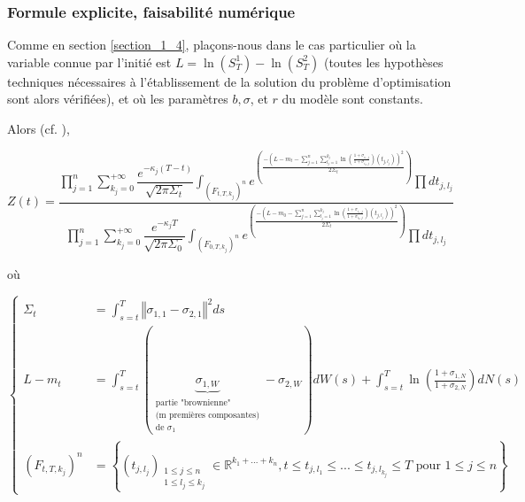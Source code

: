 \documentclass[../finalreport.tex]{subfiles}
\begin{document}
\subsubsection{Formule explicite, faisabilité numérique}

\par Comme en section \ref{section_1_4}, plaçons-nous dans le cas particulier où la variable connue par l'initié est $L = \ln \left( S_T^{1} \right) - \ln \left( S_T^{2} \right)$ (toutes les hypothèses techniques nécessaires à l'établissement de la solution du problème d'optimisation sont alors vérifiées), et où les paramètres $b, \sigma$, et $r$ du modèle sont constants.

\par Alors (cf. \cite{art5}), 

\begin{displaymath}
Z \left( t \right) = \dfrac{\prod\limits_{j = 1}^{n} \sum\limits_{k_j = 0}^{+ \infty} \dfrac{e^{- {\kappa}_j \left( T - t\right)}}{\sqrt{2 \pi {\Sigma}_t}} {\displaystyle \int_{{\left( F_{t, T, k_j}\right)}^n}} e^{\left( \frac{- \left( L - m_t - \sum\limits_{j = 1}^{n} \sum\limits_{l_j = 1}^{k_j} \ln \left( \frac{1 + {\sigma}_{i_1, j}}{1 + {\sigma}_{i_2, j}} \right) \left( t_{j, l_j} \right) \right)^2}{2 {\Sigma}_t} \right)} \prod d t_{j, l_j}}{\prod\limits_{j = 1}^{n} \sum\limits_{k_j = 0}^{+ \infty} \dfrac{e^{- {\kappa}_j T}}{\sqrt{2 \pi {\Sigma}_0}} {\displaystyle \int_{{\left( F_{0, T, k_j}\right)}^n}} e^{\left( \frac{- \left( L - m_0 - \sum\limits_{j = 1}^{n} \sum\limits_{l_j = 1}^{k_j} \ln \left( \frac{1 + {\sigma}_{i_1, j}}{1 + {\sigma}_{i_2, j}} \right) \left( t_{j, l_j} \right) \right)^2}{2 {\Sigma}_t} \right)} \prod d t_{j, l_j}}
\end{displaymath}

où

\begin{displaymath}
\begin{cases}
{\Sigma}_t &= \displaystyle \int_{s = t}^{T} \left\Vert \sigma_{1, 1} - \sigma_{2, 1} \right\Vert^2 ds \\
L - m_t &= \displaystyle \int_{s = t}^{T} \left( \underbrace{\sigma_{1, W}}_{\substack{\text{partie "brownienne"} \\ \text{(m premières composantes)} \\ \text{de } \sigma_1}} - \sigma_{2, W} \right) dW(s) + \int_{s = t}^{T} \ln \left( \frac{1 + \sigma_{1, N}}{1 + \sigma_{2, N}} \right) dN(s) \\
{\left( F_{t, T, k_j}\right)}^n &= \left\lbrace \left( t_{j, l_j} \right)_{\substack{1\leq j\leq n \\ 1\leq l_j\leq k_j}} \in \mathbb{R}^{k_1 + ... + k_n}, t \leq t_{j, l_1} \leq ... \leq t_{j, l_{k_j}} \leq T \text{ pour } 1 \leq j \leq n \right\rbrace
\end{cases}
\end{displaymath}
\end{document}
